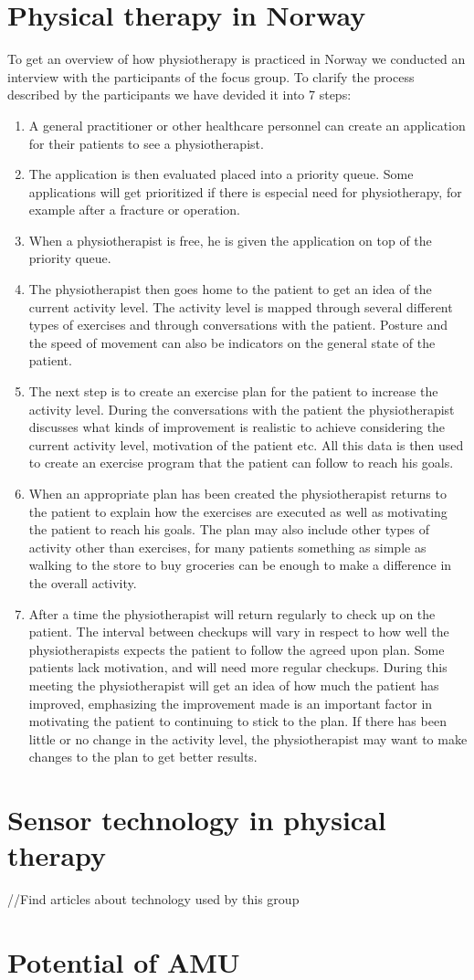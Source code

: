 \section{Physical therapy in Norway}
To get an overview of how physiotherapy is practiced in Norway we conducted an interview with the participants of the focus group. To clarify the process described by the participants we have devided it into 7 steps:
\vspace{-4mm}
\begin{enumerate}
  \item A general practitioner or other healthcare personnel can create an application for their patients to see a physiotherapist.
  \item The application is then evaluated placed into a priority queue. Some applications will get prioritized if there is especial need for physiotherapy, for example after a fracture or operation.
  \item When a physiotherapist is free, he is given the application on top of the priority queue. 
  \item The physiotherapist then goes home to the patient to get an idea of the current activity level. The activity level is mapped through several different types of exercises and through conversations with the patient. Posture and the speed of movement can also be indicators on the general state of the patient.
  \item The next step is to create an exercise plan for the patient to increase the activity level. During the conversations with the patient the physiotherapist discusses what kinds of improvement is realistic to achieve considering the current activity level, motivation of the patient etc. All this data is then used to create an exercise program that the patient can follow to reach his goals.
  \item When an appropriate plan has been created the physiotherapist returns to the patient to explain how the exercises are executed as well as motivating the patient to reach his goals. The plan may also include other types of activity other than exercises, for many patients something as simple as walking to the store to buy groceries can be enough to make a difference in the overall activity.
  \item After a time the physiotherapist will return regularly to check up on the patient. The interval between checkups will vary in respect to how well the physiotherapists expects the patient to follow the agreed upon plan. Some patients lack motivation, and will need more regular checkups. During this meeting the physiotherapist will get an idea of how much the patient has improved, emphasizing the improvement made is an important factor in motivating the patient to continuing to stick to the plan. If there has been little or no change in the activity level, the physiotherapist may want to make changes to the plan to get better results.
\end{enumerate}

\section{Sensor technology in physical therapy}
//Find articles about technology used by this group

\section{Potential of AMU}
